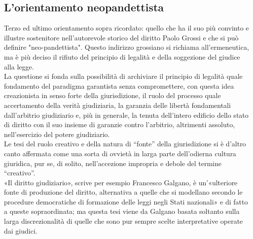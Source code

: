 \subsection{L'orientamento neopandettista} %
Terzo ed ultimo orientamento sopra ricordato: quello che ha il suo più convinto e illustre sostenitore nell’autorevole storico del diritto Paolo Grossi e che si può definire "neo-pandettista".%
Questo indirizzo grossiano si richiama all’ermeneutica, ma è più deciso il rifiuto del principio di legalità e della soggezione del giudice alla legge.
\\La questione si fonda sulla possibilità di archiviare il principio di legalità quale fondamento del paradigma garantista senza compromettere, con questa idea creazionista in senso forte della giurisdizione, il ruolo del processo quale accertamento della verità giudiziaria, la garanzia delle libertà fondamentali dall’arbitrio giudiziario e, più in generale, la tenuta dell’intero edificio dello stato di diritto con il suo insieme di garanzie contro l’arbitrio, altrimenti assoluto, nell’esercizio del potere giudiziario.
\\Le tesi del ruolo creativo e della natura di “fonte” della giurisdizione si è d’altro canto affermata come una sorta di ovvietà in larga parte dell’odierna cultura giuridica, pur se, di solito, nell’accezione impropria e debole del termine “creativo”. 
\\«Il diritto giudiziario», scrive per esempio Francesco Galgano, è un’«ulteriore fonte di produzione del diritto, alternativa a quelle che si modellano secondo le procedure democratiche di formazione delle leggi negli Stati nazionali» e di fatto a queste sopraordinata; ma questa tesi viene da Galgano basata soltanto sulla larga discrezionalità di quelle che sono pur sempre scelte interpretative operate dai giudici.
